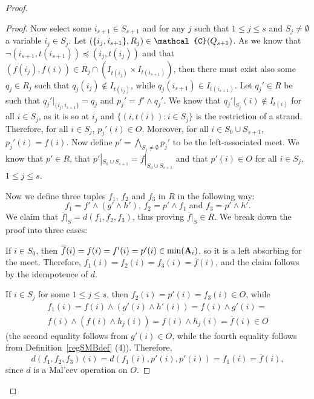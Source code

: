 \documentclass[10pt,a4paper]{amsart}
\newcommand{\m}[1]{{\uppercase {\mathbf {#1}}}}
\newcommand{\mt}{\wedge}
\newcommand{\vr}[1]{{\uppercase {\mathcal{#1}}}}
\begin{document}
\begin{proof}
\begin{proof}
Now select some $i_{s+1}\in S_{s+1}$ and for any $j$ such that $1\leq j\leq s$ and $S_j\neq \emptyset$ a variable $i_j\in S_j$. Let $(\{i_j,i_{s+1}\},R_j)\in \vr c(Q_{s+1})$. As we know that $\neg(i_{s+1},t(i_{s+1}))\preceq(i_j,t(i_j))$ and that $(f(i_j),f(i))\in R_j\cap (I_{t(i_j)}\times I_{t(i_{s+1})})$, then there must exist also some $q_j\in R_j$ such that $q_j(i_j)\notin I_{t(i_j)}$, while $q_j(i_{s+1})\in I_{t(i_{s+1})}$. Let $q_j'\in R$ be such that $q_j'|_{\{i_j,i_{s+1}\}}=q_j$ and $p_j'=f'\mt q_j'$. We know that $q_j'|_{S_j}(i)\notin I_{t(i)}$ for all $i\in S_j$, as it is so at $i_j$ and $\{(i,t(i)):i\in S_j\}$ is the restriction of a strand. Therefore, for all $i\in S_j$, $p_j'(i)\in O$. Moreover, for all $i\in S_0\cup S_{s+1}$, $p_j'(i)=f(i)$. Now define $p'=\bigwedge\limits_{S_j\neq \emptyset}p_j'$ to be the left-associated meet. We know that $p'\in R$, that $p'|_{S_0\cup S_{s+1}}=f|_{S_0\cup S_{s+1}}$ and that $p'(i)\in O$ for all $i\in S_j$, $1\leq j\leq s$.

Now we define three tuples $f_1$, $f_2$ and $f_3$ in $R$ in the following way: $$f_1=f'\mt (g'\mt h')\text{, }f_2=p'\mt f_1\text{ and }f_3=p'\mt h'.$$ We claim that $\overline{f}|_S=d(f_1,f_2,f_3)$, thus proving $\overline{f}|_S\in R$. We break down the proof into three cases: 

If $i\in S_0$, then $\overline{f}(i)=f(i)=f'(i)=p'(i)\in\mathrm{min}(\m A_i)$, so it is a left absorbing for the meet. Therefore, $f_1(i)=f_2(i)=f_3(i)=\overline{f}(i)$, and the claim follows by the idempotence of $d$.

If $i\in S_j$ for some $1\leq j\leq s$, then $f_2(i)=p'(i)=f_3(i)\in O$, while 
$$
\begin{gathered}
f_1(i)=f(i)\mt (g'(i)\mt h'(i))=f(i)\mt g'(i)=\\
f(i)\mt(f(i)\mt h_j(i)) =f(i)\mt h_j(i)=\overline{f}(i)\in O
\end{gathered}
$$ (the second equality follows from $g'(i)\in O$, while the fourth equality follows from Definition~\ref{regSMBdef} (4)). Therefore, $$d(f_1,f_2,f_3)(i)=d(f_1(i),p'(i),p'(i))=f_1(i)=\overline{f}(i),$$ since $d$ is a Mal'cev operation on $O$.


\end{proof}
\end{proof}
\end{document}
